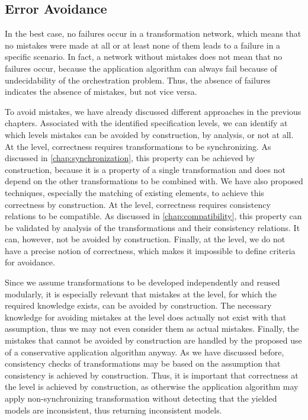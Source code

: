 \subsection{Error Avoidance}

In the best case, no failures occur in a transformation network, which means that no mistakes were made at all or at least none of them leads to a failure in a specific scenario.
In fact, a network without mistakes does not mean that no failures occur, because the application algorithm can always fail because of undecidability of the orchestration problem.
Thus, the absence of failures indicates the absence of mistakes, but not vice versa.

To avoid mistakes, we have already discussed different approaches in the previous chapters.
Associated with the identified specification levels, we can identify at which levels mistakes can be avoided by construction, by analysis, or not at all.
At the \leveltransformation level, correctness requires transformations to be synchronizing.
As discussed in \autoref{chap:synchronization}, this property can be achieved by construction, because it is a property of a single transformation and does not depend on the other transformations to be combined with.
We have also proposed techniques, especially the matching of existing elements, to achieve this correctness by construction.
At the \levelnetworkrelation level, correctness requires consistency relations to be compatible.
As discussed in \autoref{chap:compatibility}, this property can be validated by analysis of the transformations and their consistency relations.
It can, however, not be avoided by construction.
Finally, at the \levelnetworkrule level, we do not have a precise notion of correctness, which makes it impossible to define criteria for avoidance.

Since we assume transformations to be developed independently and reused modularly, it is especially relevant that mistakes at the \leveltransformation level, for which the required knowledge exists, can be avoided by construction.
The necessary knowledge for avoiding mistakes at the \levelnetworkrelation level does actually not exist with that assumption, thus we may not even consider them as actual mistakes.
Finally, the mistakes that cannot be avoided by construction are handled by the proposed use of a conservative application algorithm anyway.
As we have discussed before, consistency checks of transformations may be based on the assumption that consistency is achieved by construction.
Thus, it is important that correctness at the \leveltransformation level is achieved by construction, as otherwise the application algorithm may apply non-synchronizing transformation without detecting that the yielded models are inconsistent, thus returning inconsistent models.

